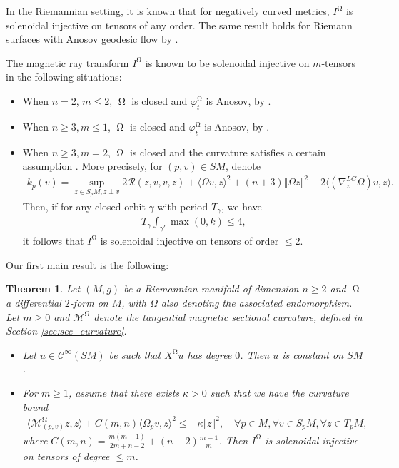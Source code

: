 \documentclass[12pt]{amsart}
\numberwithin{numbering}{section}
\theoremstyle{plain}
\newtheorem{thm}[numbering]{Theorem}
\theoremstyle{definition}
\theoremstyle{remark}
\numberwithin{equation}{section}
\DeclareMathOperator{\mg}{\Omega}
\begin{document}
In the Riemannian setting, it is known \cite{paternain2015invariant} that for negatively curved metrics, $I^{\mg}$ is solenoidal injective on tensors of any order. The same result holds for Riemann surfaces with Anosov geodesic flow by \cite{paternain2014invariant, guillarmou2017invariant}.

The magnetic ray transform $I^{\mg}$ is known to be solenoidal injective on $m$-tensors in the following situations:
\begin{itemize}
\item When $n = 2$, $m \leq 2$, $\mg$ is closed and $\varphi_t^{\mg}$ is Anosov, by \cite[Theorem 1.1]{ainsworth2012magnetic}.
\item When $n \geq 3, m \leq 1$, $\mg$ is closed and $\varphi_t^{\mg}$ is Anosov, by \cite[Theorem B]{dairbekov2008optical}.
\item When $n \geq 3, m = 2$, $\mg$ is closed and the curvature satisfies a certain assumption \cite[Theorem 6.3]{munoz2025guillarmou}. More precisely, for $(p, v) \in SM$, denote
\begin{align*}
k_p(v) = \sup_{z \in S_p M, z \perp v} 2 \mathcal{R}(z, v, v, z) + \langle \Omega v, z \rangle^2 + (n+3) \Vert \Omega z \Vert^2 - 2 \langle (\nabla^{LC}_z \Omega) v, z \rangle.
\end{align*}
Then, if for any closed orbit $\gamma$ with period $T_\gamma$, we have 
\begin{align} \label{eq:crit_dp}
T_\gamma \int_{\gamma'} \max(0, k) \leq 4,
\end{align}
it follows that $I^{\mg}$ is solenoidal injective on tensors of order $\leq 2$.
\end{itemize}

Our first main result is the following:

\begin{thm} \label{thm:tensor_tomo_intro}
Let $(M, g)$ be a Riemannian manifold of dimension $n \geq 2$ and $\mg$ a differential $2$-form on $M$, with $\Omega$ also denoting the associated endomorphism. Let $m \geq 0$ and $\mathcal{M}^{\mg}$ denote the tangential magnetic sectional curvature, defined in Section \ref{sec:sec_curvature}.

\begin{itemize}
\item[(1)] Let $u \in \mathcal{C}^\infty(SM)$ be such that $X^{\mg} u$ has degree $0$. Then $u$ is constant on $SM$.
\item[(2)] For $m \geq 1$, assume that there exists $\kappa > 0$ such that we have the curvature bound
\begin{align*}
\langle \mathcal{M}^{\mg}_{(p, v)} z, z \rangle + C(m, n) \langle \Omega_p v, z \rangle^2 \leq - \kappa \Vert z \Vert^2, \quad \forall p \in M, \forall v \in S_p M, \forall z \in T_p M,
\end{align*}
where $C(m, n) = \frac{m(m-1)}{2m+n-2} + (n-2) \frac{m-1}{m}$. Then $I^{\mg}$ is solenoidal injective on tensors of degree $\leq m$.
\end{itemize}
\end{thm}
\end{document}
